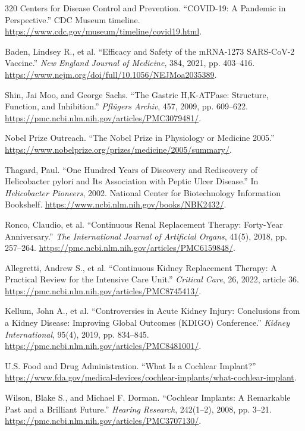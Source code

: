 \documentclass[12pt,oneside]{book}
\begin{document}
\begin{thebibliography}{320}
Centers for Disease Control and Prevention. ``COVID-19: A Pandemic in
Perspective.'' CDC Museum timeline.
\url{https://www.cdc.gov/museum/timeline/covid19.html}.

Baden, Lindsey R., et al. ``Efficacy and Safety of the mRNA-1273 SARS-CoV-2
Vaccine.'' \emph{New England Journal of Medicine}, 384, 2021, pp. 403--416.
\url{https://www.nejm.org/doi/full/10.1056/NEJMoa2035389}.

Shin, Jai Moo, and George Sachs. ``The Gastric H,K-ATPase: Structure,
Function, and Inhibition.'' \emph{Pfl\"ugers Archiv}, 457, 2009,
pp. 609--622. \url{https://pmc.ncbi.nlm.nih.gov/articles/PMC3079481/}.

Nobel Prize Outreach. ``The Nobel Prize in Physiology or Medicine 2005.''
\url{https://www.nobelprize.org/prizes/medicine/2005/summary/}.

Thagard, Paul. ``One Hundred Years of Discovery and Rediscovery of
Helicobacter pylori and Its Association with Peptic Ulcer Disease.'' In
\emph{Helicobacter Pioneers}, 2002. National Center for Biotechnology
Information Bookshelf. \url{https://www.ncbi.nlm.nih.gov/books/NBK2432/}.

Ronco, Claudio, et al. ``Continuous Renal Replacement Therapy: Forty-Year
Anniversary.'' \emph{The International Journal of Artificial Organs}, 41(5),
2018, pp. 257--264. \url{https://pmc.ncbi.nlm.nih.gov/articles/PMC6159848/}.

Allegretti, Andrew S., et al. ``Continuous Kidney Replacement Therapy: A
Practical Review for the Intensive Care Unit.'' \emph{Critical Care}, 26,
2022, article 36. \url{https://pmc.ncbi.nlm.nih.gov/articles/PMC8745413/}.

Kellum, John A., et al. ``Controversies in Acute Kidney Injury: Conclusions
from a Kidney Disease: Improving Global Outcomes (KDIGO) Conference.''
\emph{Kidney International}, 95(4), 2019, pp. 834--845.
\url{https://pmc.ncbi.nlm.nih.gov/articles/PMC8481001/}.

U.S. Food and Drug Administration. ``What Is a Cochlear Implant?''
\url{https://www.fda.gov/medical-devices/cochlear-implants/what-cochlear-implant}.

Wilson, Blake S., and Michael F. Dorman. ``Cochlear Implants: A Remarkable
Past and a Brilliant Future.'' \emph{Hearing Research}, 242(1--2), 2008,
pp. 3--21. \url{https://pmc.ncbi.nlm.nih.gov/articles/PMC3707130/}.


\end{thebibliography}
\end{document}
